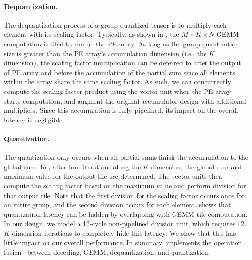 



\paragraph{Dequantization.}
The dequantization process of a group-quantized tensor is to multiply each element with its scaling factor.
Typically, as shown in , the $M\times K \times N$ GEMM computation is tiled to run on the PE array. 
As long as the group quantization size is greater than the PE array's accumulation dimension (i.e., the $K$ dimension), the scaling factor multiplication can be deferred to after the output of PE array and before the accumulation of the partial sum since all elements within the array share the same scaling factor.
As such, we can concurrently compute the scaling factor product using the vector unit when the PE array starts computation, and augment the original accumulator design with additional multipliers.
Since this accumulation is fully pipelined, its impact on the overall latency is negligible.



\paragraph{Quantization.}
The quantization only occurs when all partial sums finish the accumulation to the global sum. 
In , after four iterations along the $K$ dimension, the global sum and maximum value for the output tile are determined.
The vector units then compute the scaling factor based on the maximum value and perform division for that output tile.
Note that the first division for the scaling factor occurs once for an entire group, and the second division occurs for each element.
 shows that quantization latency can be hidden by overlapping with GEMM tile computation.
In our design, we model a 12-cycle non-pipelined division unit, which requires  12 $K$-dimension iterations to completely hide this latency.
We show that this has little impact on our overall performance.
In summary, \proj implements the operation fusion~\cite{niu2021dnnfusion,zhou2023ugrapher,zheng2023chimera,zhap2022tacker} between decoding, GEMM, dequantization, and quantization.





